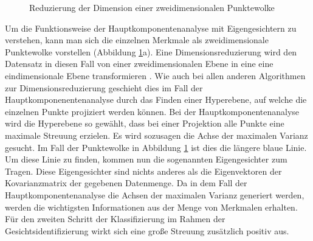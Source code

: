 \documentclass[doktyp=semarbeit, sprache=german]{TUBAFarbeiten}
\begin{document}
\begin{figure}
\begin{subfigure}[c]{0.49\textwidth}
\end{subfigure}
\caption{Reduzierung der Dimension einer zweidimensionalen Punktewolke }
\label{img:PCA}
\end{figure}Um die Funktionsweise der Hauptkomponentenanalyse mit Eigengesichtern zu verstehen, kann man sich die einzelnen Merkmale als zweidimensionale Punktewolke vorstellen (Abbildung \ref{img:PCA}a). Eine Dimensionsreduzierung wird den Datensatz in diesen Fall von einer zweidimensionalen Ebene in eine eine eindimensionale Ebene transformieren \cite{PCAPython}. Wie auch bei allen anderen Algorithmen zur Dimensionsreduzierung geschieht dies im Fall der Hauptkomponenentenanalyse durch das Finden einer Hyperebene, auf welche die einzelnen Punkte projiziert werden können. Bei der Hauptkomponentenanalyse wird die Hyperebene so gewählt, dass bei einer Projektion alle Punkte eine maximale Streuung erzielen. Es wird sozusagen die Achse der maximalen Varianz gesucht. Im Fall der Punktewolke in Abbildung \ref{img:PCA} ist dies die längere blaue Linie. Um diese Linie zu finden, kommen nun die sogenannten Eigengesichter zum Tragen. Diese Eigengesichter sind nichts anderes als die Eigenvektoren der Kovarianzmatrix der gegebenen Datenmenge. Da in dem Fall der Hauptkomponentenanalyse die Achsen der maximalen Varianz generiert werden, werden die wichtigsten Informationen aus der Menge von Merkmalen erhalten. Für den zweiten Schritt der Klassifizierung im Rahmen der Gesichtsidentifizierung wirkt sich eine große Streuung zusätzlich positiv aus.
\end{document}
